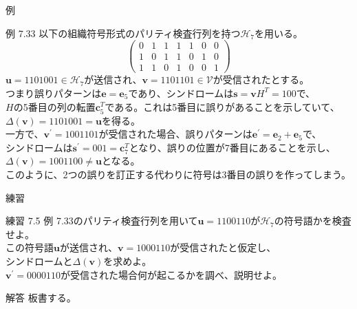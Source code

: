 \documentclass[dvipdfmx,10pt,jsarticle]{beamer}
\newcommand{\code}[1]{\mathcal{#1}}
\newcommand{\vs}[1]{\mathcal{#1}}
\renewcommand{\vec}[1]{\mathbf{#1}}
\begin{document}
  \begin{frame}{例}
    \begin{block}{例 7.33}
      以下の組織符号形式のパリティ検査行列を持つ$\code{H}_7$を用いる。
      \[ \begin{pmatrix}
          0 & 1 & 1 & 1 & 1 & 0 & 0 \\
          1 & 0 & 1 & 1 & 0 & 1 & 0 \\
          1 & 1 & 0 & 1 & 0 & 0 & 1
      \end{pmatrix} \]
      $\vec{u} = 1101001 \in \code{H}_7$が送信され、$\vec{v} = 1101101 \in \vs{V}$が受信されたとする。 \\
      つまり誤りパターンは$\vec{e} = \vec{e}_5$であり、シンドロームは$\vec{s} = \vec{v} H^T = 100$で、\\
      $H$の5番目の列の転置$\vec{c}_5^T$である。これは5番目に誤りがあることを示していて、$\Delta (\vec{v}) = 1101001 = \vec{u}$を得る。 \\
      一方で、$\vec{v}^\prime= 1001101$が受信された場合、誤りパターンは$\vec{e}^\prime = \vec{e}_2 + \vec{e}_5$で、\\
      シンドロームは$\vec{s}^\prime = 001 = \vec{c}_7^T$となり、誤りの位置が7番目にあることを示し、\\
      $\Delta(\vec{v}) = 1001100 \ne \vec{u}$となる。\\
      このように、2つの誤りを訂正する代わりに符号は3番目の誤りを作ってしまう。
    \end{block}
  \end{frame}

  \begin{frame}{練習}
    \begin{block}{練習 7.5}
      例 7.33のパリティ検査行列を用いて$\vec{u} = 1100110$が$\code{H}_7$の符号語かを検査せよ。 \\
      この符号語$\vec{u}$が送信され、$\vec{v}=1000110$が受信されたと仮定し、\\
      シンドロームと$\Delta (\vec{v})$を求めよ。 \\
      $\vec{v}^\prime = 0000110$が受信された場合何が起こるかを調べ、説明せよ。
    \end{block}
    \begin{block}{解答}
      板書する。
    \end{block}
  \end{frame}
\end{document}

